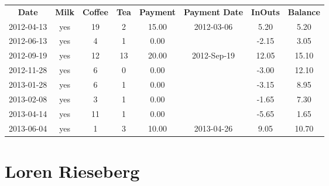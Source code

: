 \begin{center}
\begin{tabular}{cccccccc}
\textbf{Date} & \textbf{Milk} & \textbf{Coffee} & \textbf{Tea} & \textbf{Payment} & \textbf{Payment Date} & \textbf{InOuts} & \textbf{Balance} \\
2012-04-13 & yes & 19 &  2 & 15.00 & 2012-03-06 &  5.20 &  5.20\\ 
2012-06-13 & yes &  4 &  1 &  0.00 &  & -2.15 &  3.05\\ 
2012-09-19 & yes & 12 & 13 & 20.00 & 2012-Sep-19 & 12.05 & 15.10\\ 
2012-11-28 & yes &  6 &  0 &  0.00 &  & -3.00 & 12.10\\ 
2013-01-28 & yes &  6 &  1 &  0.00 &  & -3.15 &  8.95\\ 
2013-02-08 & yes &  3 &  1 &  0.00 &  & -1.65 &  7.30\\ 
2013-04-14 & yes & 11 &  1 &  0.00 &  & -5.65 &  1.65\\ 
2013-06-04 & yes &  1 &  3 & 10.00 & 2013-04-26 &  9.05 & 10.70
\end{tabular}
\end{center}

\section{Loren Rieseberg}

